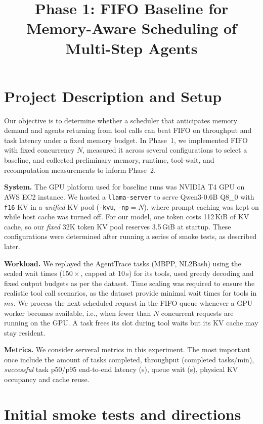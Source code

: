 \documentclass[10pt,twocolumn,letterpaper]{article}
\title{\vspace{-1.6em}\large\textbf{Phase 1: FIFO Baseline for Memory-Aware Scheduling of Multi-Step Agents}\vspace{-1.8em}}
\author{}
\date{}
\newcommand{\dec}[1]{\par\noindent\textit{Decision:} #1\par}
\begin{document}
\maketitle

\section{Project Description and Setup}
Our objective is to determine whether a scheduler that anticipates memory demand and agents returning from tool calls can beat FIFO on throughput and task latency under a fixed memory budget. In Phase~1, we implemented FIFO with fixed concurrency $N$, measured it across several configurations to select a baseline, and collected preliminary memory, runtime, tool-wait, and recomputation measurements to inform Phase~2.

\textbf{System.} The GPU platform used for baseline runs was NVIDIA T4 GPU on AWS EC2 instance.
We hosted a \texttt{llama-server} to serve Qwen3-0.6B Q8\_0 with \texttt{f16} KV in a \emph{unified} KV pool (\texttt{-kvu}, \texttt{-np}$=N$), where prompt caching was kept on while host cache was turned off. For our model, one token costs 112\,KiB of KV cache, so our \textit{fixed} 32K token KV pool reserves 3.5\,GiB at startup. These configurations were determined after running a series of smoke tests, as described later.

\textbf{Workload.} We replayed the AgentTrace tasks (MBPP, NL2Bash) using the scaled wait times ($150\times$, capped at 10\,s) for its tools, used greedy decoding and fixed output budgets as per the dataset. Time scaling was required to ensure the realistic tool call scenarios, as the dataset provide minimal wait times for tools in $ms$. We process the next scheduled request in the FIFO queue whenever a GPU worker becomes available, i.e., when fewer than $N$ concurrent requests are running on the GPU. A task frees its slot during tool waits but its KV cache may stay resident.

\textbf{Metrics.} We consider serveral metrics in this experiment. The most important once include the amount of tasks completed, throughput (completed tasks/min), \textit{successful} task p50/p95 end-to-end latency (s), queue wait (s), physical KV occupancy and cache reuse.

\section{Initial smoke tests and directions}
\end{document}
